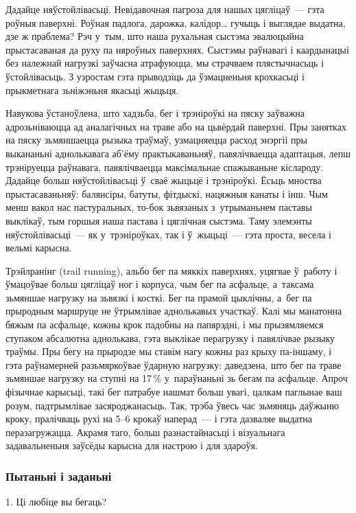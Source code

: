 Дадайце няўстойлівасьці. Невідавочная пагроза для нашых цягліцаў~--- гэта роўныя паверхні. Роўная падлога, дарожка, калідор… гучыць і выглядае выдатна, дзе ж праблема? Рэч у~тым, што наша рухальная сыстэма эвалюцыйна прыстасаваная да руху па няроўных паверхнях. Сыстэмы раўнавагі і каардынацыі без належнай нагрузкі заўчасна атрафуюцца, мы страчваем плястычнасьць і ўстойлівасьць. З узростам гэта прыводзіць да ўзмацненьня крохкасьці і прыкметнага зьніжэньня якасьці жыцьця.

Навукова ўстаноўлена, што хадзьба, бег і трэніроўкі на пяску заўважна адрозьніваюцца ад аналагічных на траве або на цьвёрдай паверхні. Пры занятках на пяску зьмяншаецца рызыка траўмаў, узмацняецца расход энэргіі пры выкананьні аднолькавага аб'ёму практыкаваньняў, павялічваецца адаптацыя, лепш трэніруецца раўнавага, павялічваецца максімальнае спажываньне кіслароду. Дадайце больш няўстойлівасьці ў~сваё жыцьцё і трэніроўкі. Ёсьць мноства прыстасаваньняў: балянсіры, батуты, фітдыскі, нацяжныя канаты і інш. Чым менш вакол нас пастуральных, то-бок зьвязаных з~утрыманьнем паставы выклікаў, тым горшыя наша пастава і цяглічная сыстэма. Таму элемэнты няўстойлівасьці~--- як у~трэніроўках, так і ў~жыцьці~--- гэта проста, весела і вельмі карысна.

Трэйлранінг (trail running), альбо бег па мяккіх паверхнях, уцягвае ў~работу і ўмацоўвае больш цягліцаў ног і корпуса, чым бег па асфальце, а~таксама зьмяншае нагрузку на зьвязкі і косткі. Бег па прамой цыклічны, а~бег па прыродным маршруце не ўтрымлівае аднолькавых участкаў. Калі мы манатонна бяжым па асфальце, кожны крок падобны на папярэдні, і мы прызямляемся ступаком абсалютна аднолькава, гэта выклікае перагрузку і павялічвае рызыку траўмы. Пры бегу на прыродзе мы ставім нагу кожны раз крыху па-іншаму, і гэта раўнамерней разьмяркоўвае ўдарную нагрузку: даведзена, што бег па траве зьмяншае нагрузку на ступні на 17\,\% у~параўнаньні зь бегам па асфальце. Апроч фізычнае карысьці, такі бег патрабуе нашмат больш увагі, цалкам паглынае ваш розум, падтрымлівае засяроджанасьць. Так, трэба ўвесь час зьмяняць даўжыню кроку, пралічваць рухі на 5--6 крокаў наперад~--- і гэта дазваляе выдатна перазагружацца. Акрамя таго, больш разнастайнасьці і візуальнага задавальненьня заўсёды карысна для настрою і для здароўя.

\subsubsection{Пытаньні і заданьні}

1. Ці любіце вы бегаць?

